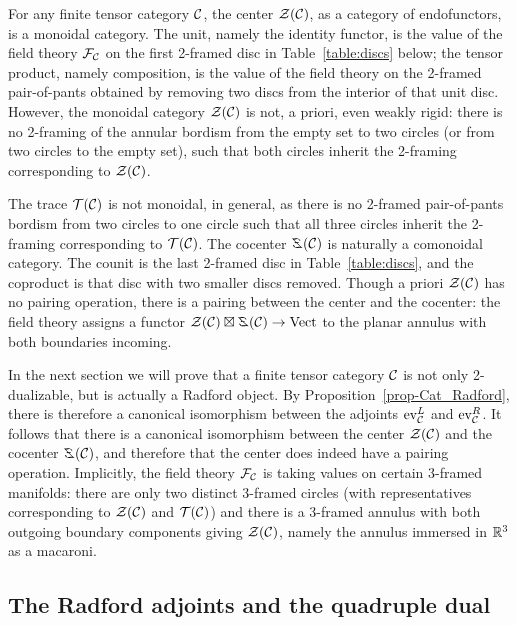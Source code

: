 \documentclass{amsart}
\begin{document}
\begin{remark}
For any finite tensor category $\mathcal C$, the center $\mathcal Z(\mathcal C)$, as a category of endofunctors, is a monoidal category.  The unit, namely the identity functor, is the value of the field theory $\mathcal F_\mathcal C$ on the first 2-framed disc in Table~\ref{table:discs} below; the tensor product, namely composition, is the value of the field theory on the 2-framed pair-of-pants obtained by removing two discs from the interior of that unit disc.  However, the monoidal category $\mathcal Z(\mathcal C)$ is not, a priori, even weakly rigid: there is no 2-framing of the annular bordism from the empty set to two circles (or from two circles to the empty set), such that both circles inherit the 2-framing corresponding to $\mathcal Z(\mathcal C)$.  

The trace $\mathcal T(\mathcal C)$ is not monoidal, in general, as there is no 2-framed pair-of-pants bordism from two circles to one circle such that all three circles inherit the 2-framing corresponding to $\mathcal T(\mathcal C)$.  The cocenter $\coZ(\cC)$ is naturally a comonoidal category.  The counit is the last 2-framed disc in Table~\ref{table:discs}, and the coproduct is that disc with two smaller discs removed.  Though a priori $\mathcal Z(\mathcal C)$ has no pairing operation, there is a pairing between the center and the cocenter: the field theory assigns a functor $\cZ(\cC) \boxtimes \coZ(\cC) \ra \Vect$ to the planar annulus with both boundaries incoming.

In the next section we will prove that a finite tensor category $\mathcal C$ is not only 2-dualizable, but is actually a Radford object.  By Proposition~\ref{prop-Cat_Radford}, there is therefore a canonical isomorphism between the adjoints $\mathrm{ev}^L_\mathcal C$ and $\mathrm{ev}^R_\mathcal C$.  It follows that there is a canonical isomorphism between the center $\mathcal Z(\mathcal C)$ and the cocenter $\coZ(\cC)$, and therefore that the center does indeed have a pairing operation.  Implicitly, the field theory $\mathcal F_\mathcal C$ is taking values on certain 3-framed manifolds: there are only two distinct 3-framed circles (with representatives corresponding to $\mathcal Z(\mathcal C)$ and $\mathcal T(\mathcal C)$) and there is a 3-framed annulus with both outgoing boundary components giving $\mathcal Z(\mathcal C)$, namely the annulus immersed in $\mathbb R^3$ as a macaroni.
\end{remark}

\subsection{The Radford adjoints and the quadruple dual} \label{sec:radfordftc}
\end{document}
